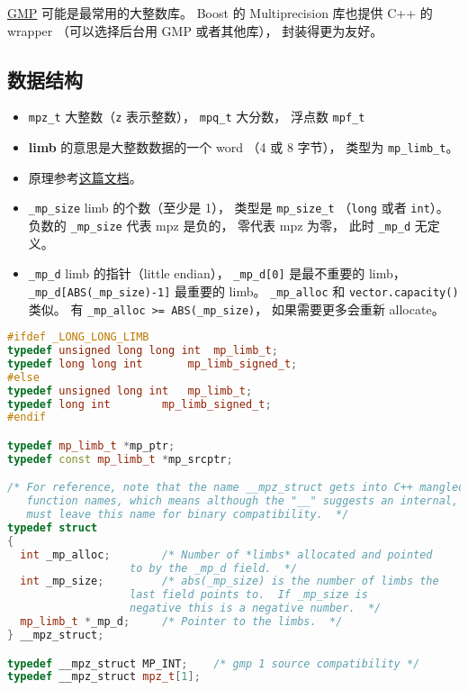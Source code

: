 
\href{https://gmplib.org/}{GMP} 可能是最常用的大整数库。 Boost 的 Multiprecision 库也提供 C++ 的 wrapper （可以选择后台用 GMP 或者其他库）， 封装得更为友好。

\subsection{数据结构}
\begin{itemize}
\item \verb|mpz_t| 大整数（\verb|z| 表示整数）， \verb|mpq_t| 大分数， 浮点数 \verb|mpf_t|
\item \textbf{limb} 的意思是大整数数据的一个 word （4 或 8 字节）， 类型为 \verb|mp_limb_t|。
\item 原理参考\href{https://gmplib.org/manual/Integer-Internals#Integer-Internals}{这篇文档}。
\item \verb|_mp_size| limb 的个数（至少是 1）， 类型是 \verb|mp_size_t| （\verb|long| 或者 \verb|int|）。 负数的 \verb|_mp_size| 代表 mpz 是负的， 零代表 mpz 为零， 此时 \verb|_mp_d| 无定义。
\item \verb|_mp_d| limb 的指针（little endian）， \verb|_mp_d[0]| 是最不重要的 limb， \verb|_mp_d[ABS(_mp_size)-1]| 最重要的 limb。
\verb|_mp_alloc| 和 \verb|vector.capacity()| 类似。 有 \verb|_mp_alloc >= ABS(_mp_size)|， 如果需要更多会重新 allocate。
\end{itemize}

\begin{lstlisting}[language=cpp]
#ifdef _LONG_LONG_LIMB
typedef unsigned long long int	mp_limb_t;
typedef long long int		mp_limb_signed_t;
#else
typedef unsigned long int	mp_limb_t;
typedef long int		mp_limb_signed_t;
#endif

typedef mp_limb_t *mp_ptr;
typedef const mp_limb_t *mp_srcptr;

/* For reference, note that the name __mpz_struct gets into C++ mangled
   function names, which means although the "__" suggests an internal, we
   must leave this name for binary compatibility.  */
typedef struct
{
  int _mp_alloc;		/* Number of *limbs* allocated and pointed
				   to by the _mp_d field.  */
  int _mp_size;			/* abs(_mp_size) is the number of limbs the
				   last field points to.  If _mp_size is
				   negative this is a negative number.  */
  mp_limb_t *_mp_d;		/* Pointer to the limbs.  */
} __mpz_struct;

typedef __mpz_struct MP_INT;    /* gmp 1 source compatibility */
typedef __mpz_struct mpz_t[1];
\end{lstlisting}
